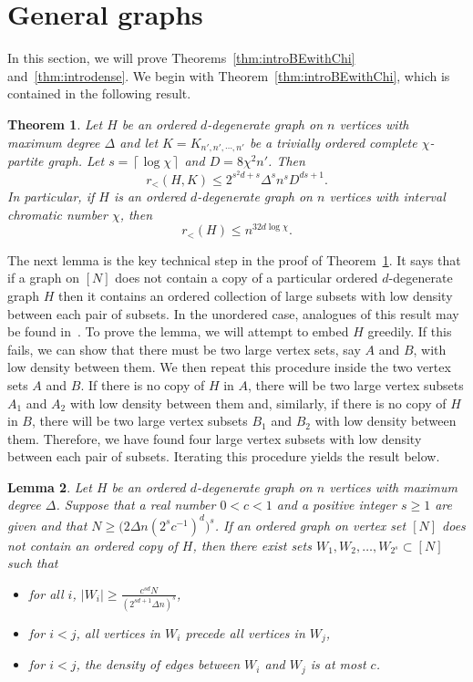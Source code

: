\documentclass[11pt]{article}
\newtheorem{theorem}{Theorem}[section]
\newtheorem{lemma}[theorem]{Lemma}
\begin{document}
\section{General graphs} \label{sec:gen}

In this section, we will prove Theorems~\ref{thm:introBEwithChi} and~\ref{thm:introdense}. We begin with Theorem~\ref{thm:introBEwithChi}, which is contained in the following result.

\begin{theorem} \label{thm:uppergen}
\label{thm:degenerate}Let $H$ be an ordered $d$-degenerate graph on $n$ vertices with maximum degree $\Delta$ and let
$K=K_{n',n',\cdots,n'}$ be a trivially ordered complete $\chi$-partite graph. Let $s=\left\lceil \log \chi\right\rceil$ 
and $D=8\chi^2 n'$. Then 
\[r_{<}(H,K)\le2^{s^2 d + s} \Delta^s n^{s} D^{ds + 1}.\]
In particular, if $H$ is an ordered $d$-degenerate graph on $n$ vertices with interval
chromatic number $\chi$, then 
\[r_{<}(H)\le n^{32 d\log\chi}.\]
\end{theorem}

The next lemma is the key technical step in the proof of Theorem~\ref{thm:uppergen}. It says that if a graph on $[N]$ does not contain a copy of a particular ordered $d$-degenerate graph $H$ then it contains an ordered collection of large subsets with low density between each pair of subsets. In the unordered case, analogues of this result may be found in~\cite{FS08, GRR}. To prove the lemma, we will attempt to embed $H$ greedily. If this fails, we can show that there must be two large vertex sets, say $A$ and $B$, with low density between them. We then repeat this procedure inside the two vertex sets $A$ and $B$. If there is no copy of $H$ in $A$, there will be two large vertex subsets $A_1$ and $A_2$ with low density between them and, similarly, if there is no copy of $H$ in $B$, there will be two large vertex subsets $B_1$ and $B_2$ with low density between them. Therefore, we have found four large vertex subsets with low density between each pair of subsets. Iterating this procedure yields the result below.

\begin{lemma} \label{lem:deg}
Let $H$ be an ordered $d$-degenerate graph on $n$ vertices with maximum degree $\Delta$. Suppose that a real number $0 < c < 1$ and a positive integer $s \geq 1$ are given and that $N \geq (2\Delta n (2^{s} c^{-1})^{d}\big)^{s}$. If an ordered graph on vertex set $[N]$ does not contain an ordered copy of $H$, then there exist sets $W_{1},W_{2},\dots,W_{2^{s}}\subset[N]$ such that 
\begin{itemize}
\item[(i)] 
for all $i$, $|W_i| \ge\frac{c^{sd} N}{(2^{sd + 1} \Delta n)^{s}}$,

\item[(ii)] 
for $i<j$, all vertices in $W_{i}$ precede all vertices in $W_{j}$,

\item[(iii)] 
for $i<j$, the density of edges between $W_{i}$ and $W_{j}$ is at most $c$.
\end{itemize}
\end{lemma}
\end{document}
